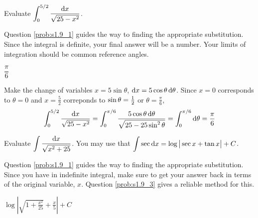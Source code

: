 \begin{Mquestion}[M105 2013A]
Evaluate $\displaystyle\int_0^{5/2} \frac{\mathrm{d}x}{\sqrt{25-x^2}}$.
\end{Mquestion}

\begin{hint} 
Question \ref{prob:s1.9_1} guides the way to finding the appropriate substitution.
Since the integral is definite, your final answer will be a number. Your limits of integration should be common reference angles.
\end{hint}

\begin{answer} 
$\dfrac{\pi}{6}$ 
\end{answer}

\begin{solution} 
 Make the change of variables $x=5\sin\theta$, $\mathrm{d}x=5\cos\theta\,\mathrm{d}\theta$. 
Since $x=0$ corresponds to $\theta=0$ and $x=\frac{5}{2}$ correponds to
$\sin\theta=\tfrac{1}{2}$ or $\theta =\frac{\pi}{6}$,
\begin{align*}
\int_0^{5/2} \frac{\mathrm{d}x}{\sqrt{25-x^2}}
=\int_0^{\pi/6} \frac{5\cos\theta\,\mathrm{d}\theta}{\sqrt{25-25\sin^2\theta}}
=\int_0^{\pi/6} \mathrm{d}\theta
=\frac{\pi}{6}
\end{align*}
\end{solution}

\begin{Mquestion}[M105 2015A]
Evaluate $\displaystyle\int \frac{\mathrm{d}x}{\sqrt{x^2+25}}$.
You may use that 
${\displaystyle\int} \sec \mathrm{d}x = \log\big|\sec x+\tan x\big|+C$.
\end{Mquestion}

\begin{hint} 
Question \ref{prob:s1.9_1} guides the way to finding the appropriate substitution. Since you have in indefinite integral, make sure to get your answer back in terms of the original variable, $x$. Question \ref{prob:s1.9_3} gives a reliable method for this.
\end{hint}

\begin{answer} 
$\displaystyle\log\left|\sqrt{1+\frac{x^2}{25}}+\frac{x}{5}\right|+C$
\end{answer}

